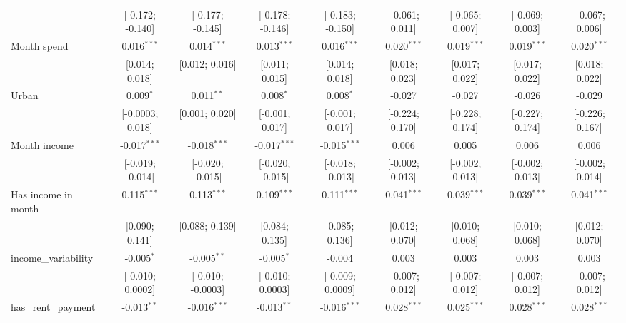 \begin{table}[htbp]
\begin{threeparttable}[b]
\begin{tabular}{lcccccccc}
                                  & [-0.172; -0.140] & [-0.177; -0.145]  & [-0.178; -0.146] & [-0.183; -0.150] & [-0.061; 0.011] & [-0.065; 0.007] & [-0.069; 0.003] & [-0.067; 0.006]\\   
         Month spend              & 0.016$^{***}$    & 0.014$^{***}$     & 0.013$^{***}$    & 0.016$^{***}$    & 0.020$^{***}$   & 0.019$^{***}$   & 0.019$^{***}$   & 0.020$^{***}$\\   
                                  & [0.014; 0.018]   & [0.012; 0.016]    & [0.011; 0.015]   & [0.014; 0.018]   & [0.018; 0.023]  & [0.017; 0.022]  & [0.017; 0.022]  & [0.018; 0.022]\\   
         Urban                    & 0.009$^{*}$      & 0.011$^{**}$      & 0.008$^{*}$      & 0.008$^{*}$      & -0.027          & -0.027          & -0.026          & -0.029\\   
                                  & [-0.0003; 0.018] & [0.001; 0.020]    & [-0.001; 0.017]  & [-0.001; 0.017]  & [-0.224; 0.170] & [-0.228; 0.174] & [-0.227; 0.174] & [-0.226; 0.167]\\   
         Month income             & -0.017$^{***}$   & -0.018$^{***}$    & -0.017$^{***}$   & -0.015$^{***}$   & 0.006           & 0.005           & 0.006           & 0.006\\   
                                  & [-0.019; -0.014] & [-0.020; -0.015]  & [-0.020; -0.015] & [-0.018; -0.013] & [-0.002; 0.013] & [-0.002; 0.013] & [-0.002; 0.013] & [-0.002; 0.014]\\   
         Has income in month      & 0.115$^{***}$    & 0.113$^{***}$     & 0.109$^{***}$    & 0.111$^{***}$    & 0.041$^{***}$   & 0.039$^{***}$   & 0.039$^{***}$   & 0.041$^{***}$\\   
                                  & [0.090; 0.141]   & [0.088; 0.139]    & [0.084; 0.135]   & [0.085; 0.136]   & [0.012; 0.070]  & [0.010; 0.068]  & [0.010; 0.068]  & [0.012; 0.070]\\   
         income\_variability      & -0.005$^{*}$     & -0.005$^{**}$     & -0.005$^{*}$     & -0.004           & 0.003           & 0.003           & 0.003           & 0.003\\   
                                  & [-0.010; 0.0002] & [-0.010; -0.0003] & [-0.010; 0.0003] & [-0.009; 0.0009] & [-0.007; 0.012] & [-0.007; 0.012] & [-0.007; 0.012] & [-0.007; 0.012]\\   
         has\_rent\_payment       & -0.013$^{**}$    & -0.016$^{***}$    & -0.013$^{**}$    & -0.016$^{***}$   & 0.028$^{***}$   & 0.025$^{***}$   & 0.028$^{***}$   & 0.028$^{***}$\\   

\end{tabular}
\end{threeparttable}
\end{table}
